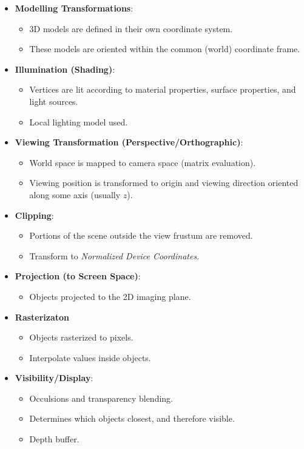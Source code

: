 \documentclass[11pt]{article}
\begin{document}
\begin{itemize}
  \item \textbf{Modelling Transformations}:
    \begin{itemize}
      \item 3D models are defined in their own coordinate system.
      \item These models are oriented within the common (world) coordinate frame.
    \end{itemize}
  \item \textbf{Illumination (Shading)}:
    \begin{itemize}
      \item Vertices are lit according to material properties, surface properties, and light sources.
      \item Local lighting model used.
    \end{itemize}
  \item \textbf{Viewing Transformation (Perspective/Orthographic)}:
    \begin{itemize}
      \item World space is mapped to camera space (matrix evaluation).
      \item Viewing position is transformed to origin and viewing direction oriented along some axis (usually $z$).
    \end{itemize}
  \item \textbf{Clipping}:
    \begin{itemize}
      \item Portions of the scene outside the view frustum are removed.
      \item Transform to \textit{Normalized Device Coordinates}.
    \end{itemize}
  \item \textbf{Projection (to Screen Space)}:
    \begin{itemize}
      \item Objects projected to the 2D imaging plane.
    \end{itemize}
  \item \textbf{Rasterizaton}
    \begin{itemize}
      \item Objects rasterized to pixels.
      \item Interpolate values inside objects.
    \end{itemize}
  \item \textbf{Visibility/Display}:
    \begin{itemize}
      \item Occulsions and transparency blending.
      \item Determines which objects closest, and therefore visible.
      \item Depth buffer.
    \end{itemize}
\end{itemize}
\end{document}

